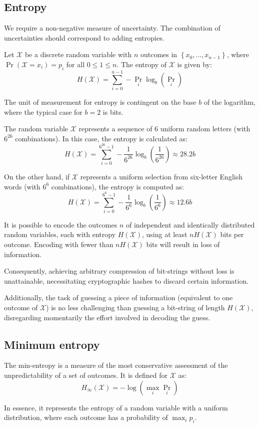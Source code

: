 \subsection{Entropy}
We require a non-negative measure of uncertainty. 
The combination of uncertainties should correspond to adding entropies.
\begin{definition}
    Let $\mathcal{X}$ be a discrete random variable with $n$ outcomes in $\left\{ x_0,\dots,x_{n-1} \right\}$, where $\Pr(\mathcal{X}=x_i)=p_i$ for all $0 \leq 1 \leq n$. 
    The entropy of $\mathcal{X}$ is given by:
    \[H(\mathcal{X})=\sum_{i=0}^{n-1}-\Pr_i\log_b\left(\Pr_i\right)\]
\end{definition}
The unit of measurement for entropy is contingent on the base $b$ of the logarithm, where the typical case for $b = 2$ is bits.
\begin{example}
    The random variable $\mathcal{X}$ represents a sequence of 6 uniform random letters (with $6^{26}$ combinations). 
    In this case, the entropy is calculated as:
    \[H(\mathcal{X})=\sum_{i=0}^{6^{26}-1}-\dfrac{1}{6^{26}}\log_b\left(\dfrac{1}{6^{26}}\right)\approx 28.2b\]

    On the other hand, if $\mathcal{X}$ represents a uniform selection from six-letter English words (with $6^{6}$ combinations), the entropy is computed as:
    \[H(\mathcal{X})=\sum_{i=0}^{6^{6}-1}-\dfrac{1}{6^{6}}\log_b\left(\dfrac{1}{6^{6}}\right)\approx 12.6b\]
\end{example}

\begin{theorem}
    It is possible to encode the outcomes $n$ of independent and identically distributed random variables, each with entropy $H(\mathcal{X})$, using at least $nH(\mathcal{X})$ bits per outcome. 
    Encoding with fewer than $nH(\mathcal{X})$ bits will result in loss of information.
\end{theorem}
Consequently, achieving arbitrary compression of bit-strings without loss is unattainable, necessitating cryptographic hashes to discard certain information.

Additionally, the task of guessing a piece of information (equivalent to one outcome of $\mathcal{X}$) is no less challenging than guessing a bit-string of length $H(\mathcal{X})$, disregarding momentarily the effort involved in decoding the guess.

\subsection{Minimum entropy}
\begin{definition}
    The min-entropy is a measure of the most conservative assessment of the unpredictability of a set of outcomes.
    It is defined for $\mathcal{X}$ as:
    \[H_\infty(\mathcal{X})=-\log(\max_i\Pr_i)\]
\end{definition}
In essence, it represents the entropy of a random variable with a uniform distribution, where each outcome has a probability of $\max_ip_i$.

